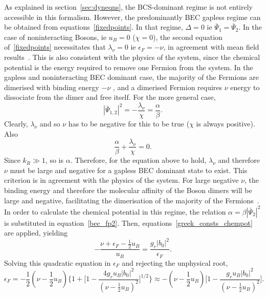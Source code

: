 \documentclass[a4paper,10pt]{article}
\begin{document}
As explained in section~\ref{sec:dyneqns}, the BCS-dominant regime is not entirely accessible in this formalism. However, the predominantly BEC gapless regime can be obtained from equations~\ref{fixedpoints}. In that regime, $\Delta=0$ ie $ \bar{\Psi}_1= \bar{\Psi}_2$. In the case of noninteracting Bosons, ie $u_B=0$ ($\chi=0$), the second equation of~\ref{fixedpoints} necessitates that $\lambda_\nu=0$ ie $\epsilon_F=-\nu$, in agreement with mean field results~\cite{huang:becbcs2}. This is also consistent with the physics of the system, since the chemical potential is the energy required to remove one Fermion from the system. In the gapless and noninteracting BEC dominant case, the majority of the Fermions are dimerised with binding energy $-\nu$ , and a dimerised Fermion requires $\nu$ energy to dissociate from the dimer and free itself. For the more general case,
\begin{equation}
\label{bec_fp}
|\bar{\Psi}_{1,2}|^2 = -\frac{\lambda_\nu}{\chi}=\frac{\alpha}{\beta}.
\end{equation}
Clearly, $\lambda_\nu$ and so $\nu$ has to be negative for this to be true ($\chi$ is always positive). Also
\begin{equation}
\label{bec_fp2}
 \frac{\alpha}{\beta}+\frac{\lambda_\nu}{\chi}=0.
\end{equation}
Since $k_R \gg 1$, so is $\alpha$. Therefore, for the equation above to hold, $\lambda_\nu$ and therefore $\nu$ must be large and negative for a gapless BEC dominant state to exist. This criterion is in agreement with the physics of the system. For large negative $\nu$, the binding energy and therefore the molecular affinity of the Boson dimers will be large and negative, facilitating the dimerisation of the majority of the Fermions~\cite{bcsbec:ohashi}.
 In order to calculate the chemical potential in this regime, the relation $\alpha=\beta| \bar{\Psi}_2|^2$ is substituted in equation~\ref{bec_fp2}. Then,  equations~\ref{greek_consts_chempot} are applied, yielding 
\begin{equation}
 -\frac{\nu+\epsilon_F-\frac{1}{2}u_B}{u_B} = \frac{g_r |b_0|^2}{\epsilon_F}.
\end{equation}
Solving this quadratic equation in $\epsilon_F$ and rejecting the unphysical root, 
\begin{equation}
\label{chempot_purebec}
\epsilon_F = -\frac{1}{2}\left(\nu-\frac{1}{2}u_B\right)\bigg\{1+ \bigg[1-\frac{4g_ru_B|b_0|^2}{\left(\nu-\frac{1}{2}u_B\right)^2} \bigg]^{1/2}\bigg\} \approx - \left(\nu-\frac{1}{2}u_B\right) \bigg[1-\frac{g_ru_B|b_0|^2}{\left(\nu-\frac{1}{2}u_B\right)^2} \bigg].
\end{equation}
\end{document}
